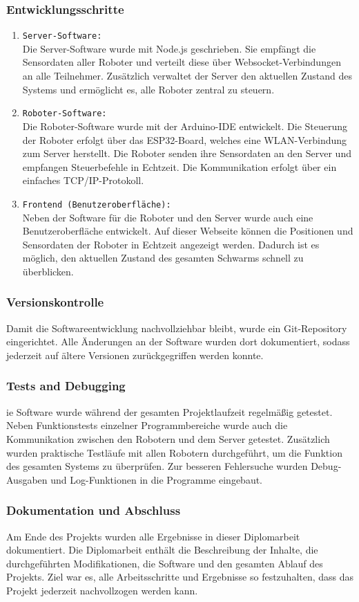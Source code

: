 \subsubsection{Entwicklungsschritte}
\begin{enumerate}
    \item \texttt{Server-Software:} \\
    Die Server-Software wurde mit Node.js geschrieben. Sie empfängt die Sensordaten aller Roboter und verteilt diese über Websocket-Verbindungen an alle Teilnehmer.
    Zusätzlich verwaltet der Server den aktuellen Zustand des Systems und ermöglicht es, alle Roboter zentral zu steuern.
    \item \texttt{Roboter-Software:} \\
    Die Roboter-Software wurde mit der Arduino-IDE entwickelt.
    Die Steuerung der Roboter erfolgt über das ESP32-Board, welches eine WLAN-Verbindung zum Server herstellt.
    Die Roboter senden ihre Sensordaten an den Server und empfangen Steuerbefehle in Echtzeit.
    Die Kommunikation erfolgt über ein einfaches TCP/IP-Protokoll.
    \item \texttt{Frontend (Benutzeroberfläche):} \\
    Neben der Software für die Roboter und den Server wurde auch eine Benutzeroberfläche entwickelt.
    Auf dieser Webseite können die Positionen und Sensordaten der Roboter in Echtzeit angezeigt werden.
    Dadurch ist es möglich, den aktuellen Zustand des gesamten Schwarms schnell zu überblicken.  
    \end{enumerate}

\subsubsection{Versionskontrolle}
Damit die Softwareentwicklung nachvollziehbar bleibt, wurde ein Git-Repository eingerichtet.
Alle Änderungen an der Software wurden dort dokumentiert, sodass jederzeit auf ältere Versionen zurückgegriffen werden konnte.
\subsubsection{Tests and Debugging}
ie Software wurde während der gesamten Projektlaufzeit regelmäßig getestet.
Neben Funktionstests einzelner Programmbereiche wurde auch die Kommunikation zwischen den Robotern und dem Server getestet.
Zusätzlich wurden praktische Testläufe mit allen Robotern durchgeführt, um die Funktion des gesamten Systems zu überprüfen.
Zur besseren Fehlersuche wurden Debug-Ausgaben und Log-Funktionen in die Programme eingebaut.
\subsubsection{Dokumentation und Abschluss}
Am Ende des Projekts wurden alle Ergebnisse in dieser Diplomarbeit dokumentiert.
Die Diplomarbeit enthält die Beschreibung der Inhalte, die durchgeführten Modifikationen, die Software und den gesamten Ablauf des Projekts.
Ziel war es, alle Arbeitsschritte und Ergebnisse so festzuhalten, dass das Projekt jederzeit nachvollzogen werden kann.